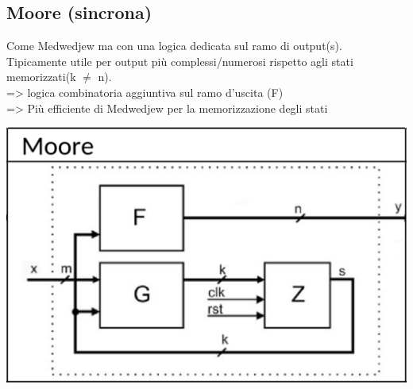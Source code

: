     \subsection{Moore (sincrona)}
    \begin{minipage}[t]{0.48\columnwidth}
        \vspace{0pt} %
        Come Medwedjew ma con una logica dedicata sul ramo di output(s).\\
        Tipicamente utile per output più complessi/numerosi rispetto agli stati memorizzati(k $\neq$ n).\\
        => logica combinatoria aggiuntiva sul ramo d'uscita (F)\\
        => Più efficiente di Medwedjew per la memorizzazione degli stati
    \end{minipage}%
    \hfill
    \begin{minipage}[t]{0.48\columnwidth}
        \vspace{0pt} %
        \includegraphics[width=\linewidth]{Images/Moore.png}
    \end{minipage}


